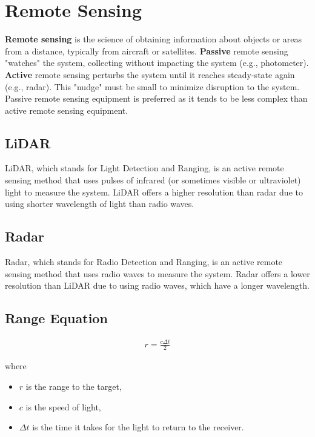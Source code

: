 \section{Remote Sensing}

\textbf{Remote sensing} is the science of obtaining information about objects or areas from a distance, typically from aircraft or satellites. \textbf{Passive} remote sensing "watches" the system, collecting without impacting the system (e.g., photometer). \textbf{Active} remote sensing perturbs the system until it reaches steady-state again (e.g., radar). This "nudge" must be small to minimize disruption to the system. Passive remote sensing equipment is preferred as it tends to be less complex than active remote sensing equipment.

\subsection{LiDAR}

LiDAR, which stands for Light Detection and Ranging, is an active remote sensing method that uses pulses of infrared (or sometimes visible or ultraviolet) light to measure the system. LiDAR offers a higher resolution than radar due to using shorter wavelength of light than radio waves.

\subsection{Radar}

Radar, which stands for Radio Detection and Ranging, is an active remote sensing method that uses radio waves to measure the system. Radar offers a lower resolution than LiDAR due to using radio waves, which have a longer wavelength.

\subsection{Range Equation}

\begin{align*}
    r = \frac{c \Delta t}{2}
\end{align*}

where

\begin{itemize}
    \item $r$ is the range to the target,
    \item $c$ is the speed of light,
    \item $\Delta t$ is the time it takes for the light to return to the receiver.
\end{itemize}

